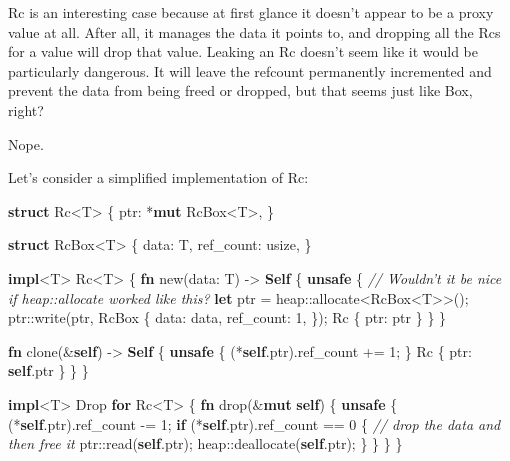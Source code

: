 \documentclass[a4paper,]{book}
\newenvironment{Shaded}{\begin{snugshade}}{\end{snugshade}}
\newcommand{\KeywordTok}[1]{\textcolor[rgb]{0.13,0.29,0.53}{\textbf{{#1}}}}
\newcommand{\DataTypeTok}[1]{\textcolor[rgb]{0.13,0.29,0.53}{{#1}}}
\newcommand{\DecValTok}[1]{\textcolor[rgb]{0.00,0.00,0.81}{{#1}}}
\newcommand{\CommentTok}[1]{\textcolor[rgb]{0.56,0.35,0.01}{\textit{{#1}}}}
\newcommand{\BuiltInTok}[1]{{#1}}
\newcommand{\NormalTok}[1]{{#1}}
\begin{document}
Rc is an interesting case because at first glance it doesn't appear to
be a proxy value at all. After all, it manages the data it points to,
and dropping all the Rcs for a value will drop that value. Leaking an Rc
doesn't seem like it would be particularly dangerous. It will leave the
refcount permanently incremented and prevent the data from being freed
or dropped, but that seems just like Box, right?

Nope.

Let's consider a simplified implementation of Rc:

\begin{Shaded}
\begin{Highlighting}[]
\KeywordTok{struct} \NormalTok{Rc<T> \{}
    \NormalTok{ptr: *}\KeywordTok{mut} \NormalTok{RcBox<T>,}
\NormalTok{\}}

\KeywordTok{struct} \NormalTok{RcBox<T> \{}
    \NormalTok{data: T,}
    \NormalTok{ref_count: }\DataTypeTok{usize}\NormalTok{,}
\NormalTok{\}}

\KeywordTok{impl}\NormalTok{<T> Rc<T> \{}
    \KeywordTok{fn} \NormalTok{new(data: T) -> }\KeywordTok{Self} \NormalTok{\{}
        \KeywordTok{unsafe} \NormalTok{\{}
            \CommentTok{// Wouldn't it be nice if heap::allocate worked like this?}
            \KeywordTok{let} \NormalTok{ptr = heap::allocate<RcBox<T>>();}
            \NormalTok{ptr::write(ptr, RcBox \{}
                \NormalTok{data: data,}
                \NormalTok{ref_count: }\DecValTok{1}\NormalTok{,}
            \NormalTok{\});}
            \NormalTok{Rc \{ ptr: ptr \}}
        \NormalTok{\}}
    \NormalTok{\}}

    \KeywordTok{fn} \NormalTok{clone(&}\KeywordTok{self}\NormalTok{) -> }\KeywordTok{Self} \NormalTok{\{}
        \KeywordTok{unsafe} \NormalTok{\{}
            \NormalTok{(*}\KeywordTok{self}\NormalTok{.ptr).ref_count += }\DecValTok{1}\NormalTok{;}
        \NormalTok{\}}
        \NormalTok{Rc \{ ptr: }\KeywordTok{self}\NormalTok{.ptr \}}
    \NormalTok{\}}
\NormalTok{\}}

\KeywordTok{impl}\NormalTok{<T> }\BuiltInTok{Drop} \KeywordTok{for} \NormalTok{Rc<T> \{}
    \KeywordTok{fn} \NormalTok{drop(&}\KeywordTok{mut} \KeywordTok{self}\NormalTok{) \{}
        \KeywordTok{unsafe} \NormalTok{\{}
            \NormalTok{(*}\KeywordTok{self}\NormalTok{.ptr).ref_count -= }\DecValTok{1}\NormalTok{;}
            \KeywordTok{if} \NormalTok{(*}\KeywordTok{self}\NormalTok{.ptr).ref_count == }\DecValTok{0} \NormalTok{\{}
                \CommentTok{// drop the data and then free it}
                \NormalTok{ptr::read(}\KeywordTok{self}\NormalTok{.ptr);}
                \NormalTok{heap::deallocate(}\KeywordTok{self}\NormalTok{.ptr);}
            \NormalTok{\}}
        \NormalTok{\}}
    \NormalTok{\}}
\NormalTok{\}}
\end{Highlighting}
\end{Shaded}
\end{document}
